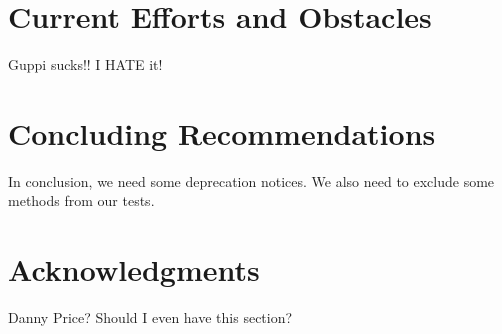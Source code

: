 \documentclass[12pt]{article}
\begin{document}
\section{Current Efforts and Obstacles}

\quad \quad Guppi sucks!! I HATE it!

\section{Concluding Recommendations}

\quad \quad In conclusion, we need some deprecation notices. We also need to exclude some methods from our tests.

\section{Acknowledgments}

\quad \quad Danny Price? Should I even have this section?
\end{document}
